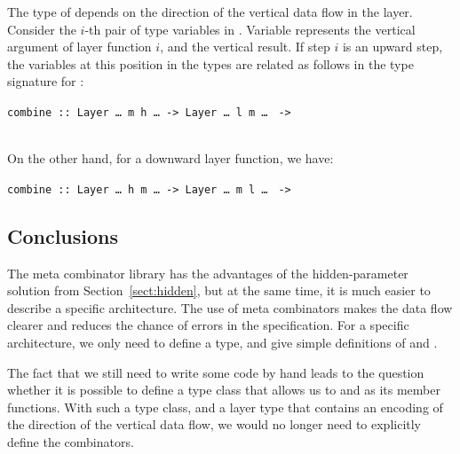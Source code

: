 \documentclass[preprint,natbib]{sigplanconf}
\begin{document}
The type of  depends on the direction of the vertical data flow in the layer. Consider the $i$-th pair of  type variables in . Variable  represents the vertical argument of layer function $i$, and  the vertical result. If step $i$ is an upward step, the variables at this position in the  types are related as follows in the type signature for :

\begin{small}
\begin{tabbing}
{\tt  combine :: }\={\tt Layer \dots~m h \dots}\verb| -> |{\tt Layer \dots~l m \dots} \verb| ->|\\
                  \\
\end{tabbing}
\end{small}

On the other hand, for a downward layer function, we have:

\begin{small}
\begin{tabbing}
{\tt  combine :: }\={\tt Layer \dots~h m \dots}\verb| -> |{\tt Layer \dots~m l \dots} \verb| ->|\\
\end{tabbing}
\end{small}


\subsection{Conclusions} 

The meta combinator library has the advantages of the hidden-parameter solution from Section~\ref{sect:hidden}, but at the same time, it is much easier to describe a specific architecture. The use of meta combinators makes the data flow clearer and reduces the chance of errors in the specification. For a specific architecture, we only need to define a  type, and give simple definitions of  and .

The fact that we still need to write some code by hand leads to the question whether it is possible to define a type class that allows us to   and  as its member functions. With such a type class, and a layer type that contains an encoding of the direction of the vertical data flow, we would no longer need to explicitly define the combinators.
\end{document}
